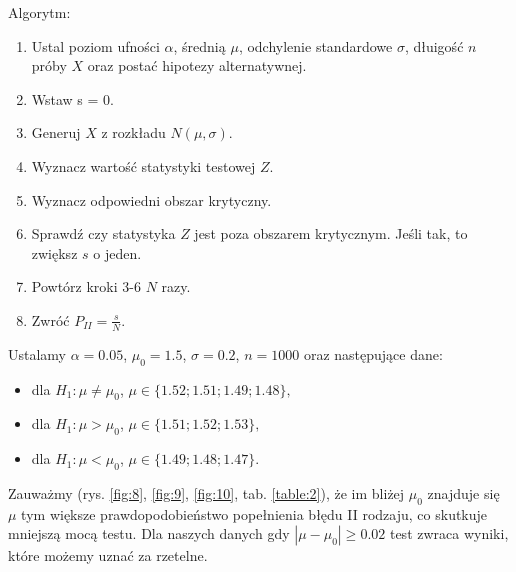 \documentclass{article}
\theoremstyle{break}
\begin{document}
Algorytm:

\begin{enumerate}
\item Ustal poziom ufności $\alpha$, średnią $\mu$, odchylenie standardowe $\sigma$, dłuigość $n$ próby $X$  oraz postać hipotezy alternatywnej.
\item Wstaw s = 0.
\item Generuj $X$ z rozkładu $N(\mu, \sigma)$.
\item Wyznacz wartość statystyki testowej $Z$.
\item Wyznacz odpowiedni obszar krytyczny.
\item Sprawdź czy statystyka $Z$ jest poza obszarem krytycznym. Jeśli tak, to zwiększ $s$ o jeden.
\item Powtórz kroki 3-6 $N$ razy.
\item Zwróć $P_{II} = \frac{s}{N}.$
\end{enumerate}

Ustalamy $\alpha = 0.05$, $\mu_0 = 1.5$, $\sigma = 0.2$, $n=1000$ oraz następujące dane:

\begin{itemize}
\item dla $H_1: \mu \ne \mu_0$, $\mu \in \{1.52; 1.51; 1.49; 1.48\},$
\item dla $H_1: \mu > \mu_0$, $\mu \in \{1.51; 1.52; 1.53\},$
\item dla $H_1: \mu < \mu_0$, $\mu \in \{1.49; 1.48; 1.47\}.$
\end{itemize}

Zauważmy (rys. \ref{fig:8}, \ref{fig:9}, \ref{fig:10}, tab. \ref{table:2}), że im bliżej $\mu_0$ znajduje się $\mu$ tym większe prawdopodobieństwo popełnienia błędu II rodzaju, co skutkuje mniejszą mocą testu. Dla naszych danych gdy $|\mu-\mu_0|\geq 0.02$ test zwraca wyniki, które możemy uznać za rzetelne.
\end{document}
